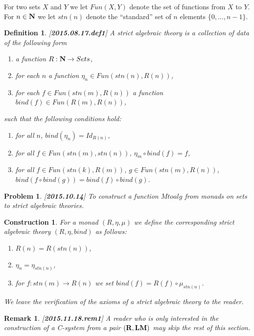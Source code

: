 \documentclass[11pt]{article}
\newtheorem{definition}[proposition]{Definition}
\newtheorem{remark}[proposition]{Remark}
\newtheorem{problem}[proposition]{Problem}
\newtheorem{construction}[proposition]{Construction}
\newcommand{\llabel}[1]{\label{#1}[{\bf #1}]}
\newcommand{\sr}{\rightarrow}
\newcommand{\nn}{{\bf N\rm}}
\newcommand{\nat}{\nn}
\newcommand{\lm}{{\bf LM}}
\newcommand{\bind}{bind}
\begin{document}
For two sets $X$ and $Y$ we let $Fun(X,Y)$ denote the set of functions from $X$ to $Y$. For $n\in\nat$ we let $stn(n)$ denote the ``standard'' set of $n$ elements $\{0,\dots,n-1\}$.
% 
\begin{definition}
\llabel{2015.08.17.def1}
A strict algebraic theory is a collection of data of the following form
%
\begin{enumerate}
\item a function $R:\nn\sr Sets$,
\item for each $n$ a function $\eta_{n}\in Fun(stn(n),R(n))$,
\item for each $f\in Fun(stn(m),R(n))$ a function $\bind(f)\in Fun(R(m),R(n))$,
\end{enumerate}
%
such that the following conditions hold:
%
\begin{enumerate}
\item for all $n$, $\bind(\eta_n)=Id_{R(n)}$,
\item for all $f\in Fun(stn(m),stn(n))$, $\eta_m\circ \bind(f)=f$,
\item for all $f\in Fun(stn(k),R(m))$, $g\in Fun(stn(m),R(n))$, $\bind(f\circ \bind(g))=\bind(f)\circ \bind(g)$.
\end{enumerate}
%
\end{definition}
%
\begin{problem}
\llabel{2015.10.14}
To construct a function $Mtoalg$ from monads on sets to strict algebraic theories.
\end{problem}
%
\begin{construction}\rm 
For a monad $(R,\eta,\mu)$ we define the corresponding strict algebraic theory $(R,\eta,\bind)$ as follows:
%
\begin{enumerate}
\item $R(n)=R(stn(n))$,
\item $\eta_n=\eta_{stn(n)}$,
\item for $f:stn(m)\sr R(n)$ we set $\bind(f)=R(f)\circ \mu_{stn(n)}$.
\end{enumerate}
%
We leave the verification of the axioms of a strict algebraic theory to the reader.
\end{construction}
%
\begin{remark}\rm
\llabel{2015.11.18.rem1}
A reader who is only interested in the construction of a C-system from a pair $({\bf R},\lm)$ may skip the rest of this section.
\end{remark}
%
\end{document}

